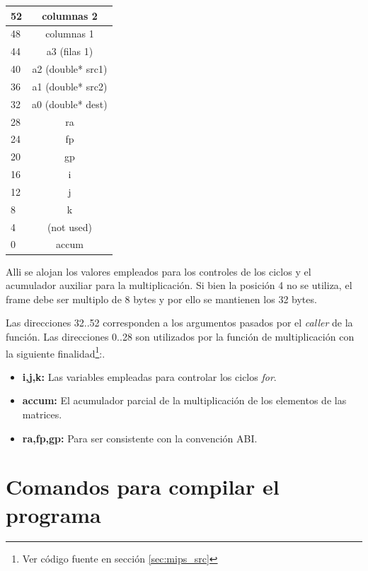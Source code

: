 \documentclass[10pt,a4paper]{article}
\begin{document}
	\begin{center}
			{\footnotesize \begin{tabular}{ |l|c| }

			\hline
				52 & columnas 2 \\ \hline
				48 & columnas 1 \\ \hline	
				44 & a3 (filas 1) \\ \hline
				40 & a2 (double* src1) \\ \hline
				36 & a1 (double* src2) \\ \hline
				32 & a0 (double* dest) \\ \hline
				28 & ra \\ \hline
				24 & fp \\ \hline
				20 & gp \\ \hline
				16 & i \\ \hline
				12 & j \\ \hline
				8 & k \\ \hline
				4 & (not used) \\ \hline
				0 & accum \\ \hline
				
			\end{tabular}}\label{tab:regtension}
	\end{center}

Alli se alojan los valores empleados para los controles de los ciclos y el acumulador auxiliar para la multiplicación. Si bien la posición 4 no se utiliza, el frame debe ser multiplo de 8 bytes y por ello se mantienen los 32 bytes.

Las direcciones 32..52 corresponden a los argumentos pasados por el \textit{caller} de la función. Las direcciones 0..28 son utilizados por la función de multiplicación con la siguiente finalidad\footnote{Ver código fuente en sección \ref{sec:mips_src}}:.

\begin{itemize}
	\item \textbf{i,j,k:} Las variables empleadas para controlar los ciclos \textit{for}.
	\item \textbf{accum:} El acumulador parcial de la multiplicación de los elementos de las matrices.
	\item \textbf{ra,fp,gp:} Para ser consistente con la convención ABI.
\end{itemize}

\section{Comandos para compilar el programa}
\end{document}
